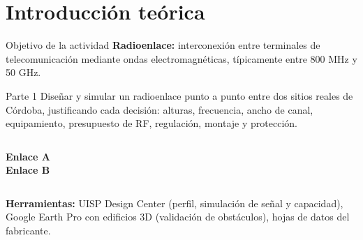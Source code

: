 \renewcommand{\seccorta}{Teoría}
\section{Introducción teórica}

\begin{frame}{Objetivo de la actividad}
  \small
  \textbf{Radioenlace:} interconexión entre terminales de telecomunicación mediante ondas
  electromagnéticas, típicamente entre 800 MHz y 50 GHz.
  \vspace{4pt}
  \begin{block}{Parte 1}
    Diseñar y simular un radioenlace punto a punto entre dos sitios reales de Córdoba,
    justificando cada decisión: alturas, frecuencia, ancho de canal, equipamiento,
    presupuesto de RF, regulación, montaje y protección.
  \end{block}
  \vspace{4pt}
  \begin{columns}[T]
    \textbf{Enlace A}\\ \EAnombre
    \textbf{Enlace B}\\ \EBnombre
  \end{columns}
  \vspace{8pt}
  \textbf{Herramientas:} UISP Design Center (perfil, simulación de señal y capacidad),
  Google Earth Pro con edificios 3D (validación de obstáculos), hojas de datos del fabricante.
\end{frame}

